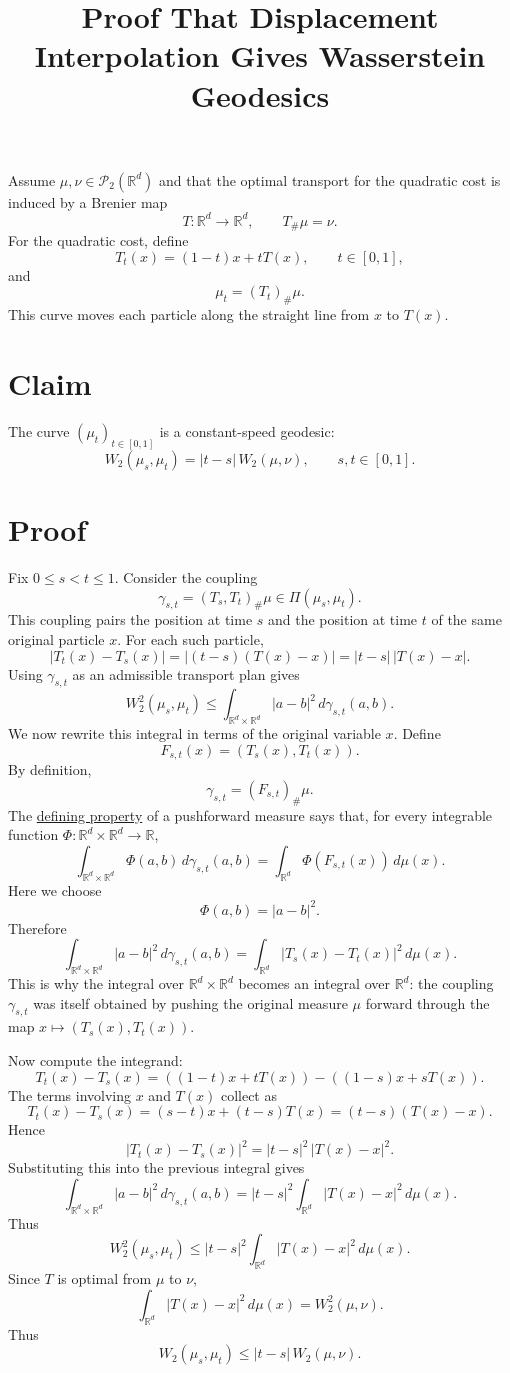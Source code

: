 \documentclass[11pt]{article}
\title{Proof That Displacement Interpolation Gives Wasserstein Geodesics}
\author{}
\date{}
\begin{document}
\maketitle

Assume $\mu,\nu\in\mathcal P_2(\mathbb R^d)$ and that the optimal transport for
the quadratic cost is induced by a Brenier map
\[
T:\mathbb R^d\to\mathbb R^d,
\qquad
T_\#\mu=\nu.
\]
For the quadratic cost, define
\[
T_t(x)=(1-t)x+tT(x),
\qquad t\in[0,1],
\]
and
\[
\mu_t=(T_t)_\#\mu.
\]
This curve moves each particle along the straight line from $x$ to $T(x)$.

\section*{Claim}

The curve $(\mu_t)_{t\in[0,1]}$ is a constant-speed geodesic:
\[
W_2(\mu_s,\mu_t)
=
|t-s|\,W_2(\mu,\nu),
\qquad
s,t\in[0,1].
\]

\section*{Proof}

Fix $0\le s<t\le 1$. Consider the coupling
\[
\gamma_{s,t}=(T_s,T_t)_\#\mu
\in \Pi(\mu_s,\mu_t).
\]
This coupling pairs the position at time $s$ and the position at time $t$ of the
same original particle $x$. For each such particle,
\[
|T_t(x)-T_s(x)|
=
|(t-s)(T(x)-x)|
=
|t-s|\,|T(x)-x|.
\]
Using $\gamma_{s,t}$ as an admissible transport plan gives
\[
W_2^2(\mu_s,\mu_t)
\le
\int_{\mathbb R^d\times\mathbb R^d}|a-b|^2\,d\gamma_{s,t}(a,b).
\]
We now rewrite this integral in terms of the original variable $x$.
Define
\[
F_{s,t}(x)=(T_s(x),T_t(x)).
\]
By definition,
\[
\gamma_{s,t}=(F_{s,t})_\#\mu.
\]
The \href{pushforward_change_of_variables.html}{defining property} of a pushforward measure says that, for every integrable
function $\Phi:\mathbb R^d\times\mathbb R^d\to\mathbb R$,
\[
\int_{\mathbb R^d\times\mathbb R^d}
\Phi(a,b)\,d\gamma_{s,t}(a,b)
=
\int_{\mathbb R^d}
\Phi(F_{s,t}(x))\,d\mu(x).
\]
Here we choose
\[
\Phi(a,b)=|a-b|^2.
\]
Therefore
\[
\int_{\mathbb R^d\times\mathbb R^d}|a-b|^2\,d\gamma_{s,t}(a,b)
=
\int_{\mathbb R^d}|T_s(x)-T_t(x)|^2\,d\mu(x).
\]
This is why the integral over $\mathbb R^d\times\mathbb R^d$ becomes an integral
over $\mathbb R^d$: the coupling $\gamma_{s,t}$ was itself obtained by pushing
the original measure $\mu$ forward through the map $x\mapsto (T_s(x),T_t(x))$.

Now compute the integrand:
\[
T_t(x)-T_s(x)
=
((1-t)x+tT(x))-((1-s)x+sT(x)).
\]
The terms involving $x$ and $T(x)$ collect as
\[
T_t(x)-T_s(x)
=
(s-t)x+(t-s)T(x)
=
(t-s)(T(x)-x).
\]
Hence
\[
|T_t(x)-T_s(x)|^2
=
|t-s|^2\,|T(x)-x|^2.
\]
Substituting this into the previous integral gives
\[
\int_{\mathbb R^d\times\mathbb R^d}|a-b|^2\,d\gamma_{s,t}(a,b)
=
|t-s|^2
\int_{\mathbb R^d}|T(x)-x|^2\,d\mu(x).
\]
Thus
\[
W_2^2(\mu_s,\mu_t)
\le
|t-s|^2
\int_{\mathbb R^d}|T(x)-x|^2\,d\mu(x).
\]
Since $T$ is optimal from $\mu$ to $\nu$,
\[
\int_{\mathbb R^d}|T(x)-x|^2\,d\mu(x)
=
W_2^2(\mu,\nu).
\]
Thus
\[
W_2(\mu_s,\mu_t)
\le
|t-s|\,W_2(\mu,\nu).
\]
\end{document}
